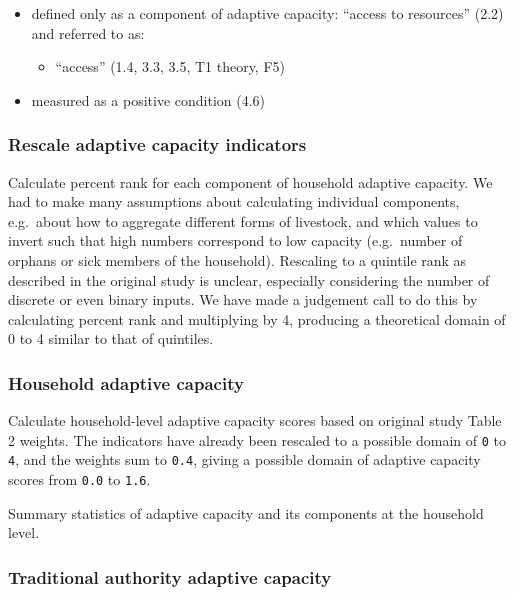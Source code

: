 \documentclass[
]{article}
\providecommand{\tightlist}{%
  \setlength{\itemsep}{0pt}\setlength{\parskip}{0pt}}
\begin{document}
\begin{itemize}
  \begin{itemize}
  \tightlist
  \item
    defined only as a component of adaptive capacity: ``access to
    resources'' (2.2) and referred to as:

    \begin{itemize}
    \tightlist
    \item
      ``access'' (1.4, 3.3, 3.5, T1 theory, F5)
    \end{itemize}
  \item
    measured as a positive condition (4.6)
  \end{itemize}
\end{itemize}

\hypertarget{rescale-adaptive-capacity-indicators}{%
\subsubsection{Rescale adaptive capacity
indicators}\label{rescale-adaptive-capacity-indicators}}

Calculate percent rank for each component of household adaptive
capacity. We had to make many assumptions about calculating individual
components, e.g.~about how to aggregate different forms of livestock,
and which values to invert such that high numbers correspond to low
capacity (e.g.~number of orphans or sick members of the household).
Rescaling to a quintile rank as described in the original study is
unclear, especially considering the number of discrete or even binary
inputs. We have made a judgement call to do this by calculating percent
rank and multiplying by 4, producing a theoretical domain of 0 to 4
similar to that of quintiles.

\hypertarget{household-adaptive-capacity}{%
\subsubsection{Household adaptive
capacity}\label{household-adaptive-capacity}}

Calculate household-level adaptive capacity scores based on original
study Table 2 weights. The indicators have already been rescaled to a
possible domain of \texttt{0} to \texttt{4}, and the weights sum to
\texttt{0.4}, giving a possible domain of adaptive capacity scores from
\texttt{0.0} to \texttt{1.6}.

Summary statistics of adaptive capacity and its components at the
household level.

\hypertarget{traditional-authority-adaptive-capacity}{%
\subsubsection{Traditional authority adaptive
capacity}\label{traditional-authority-adaptive-capacity}}
\end{document}
